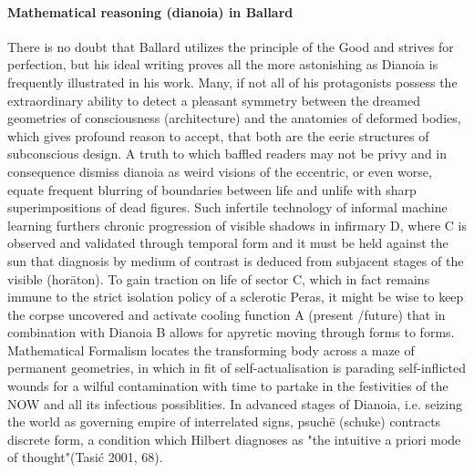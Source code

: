 \documentclass{article}
\begin{document}
\paragraph{Mathematical reasoning (dianoia) in Ballard}
There is no doubt that Ballard 
utilizes the principle of the Good and strives for perfection, 
but his ideal writing proves all the more astonishing 
as Dianoia is frequently illustrated in his work. 
Many, if not all of his protagonists possess the extraordinary ability to 
detect a pleasant symmetry between the dreamed geometries of 
consciousness (architecture) and the anatomies of deformed bodies, which gives profound reason to accept, 
that both are the eerie structures of subconscious design. 
A truth to which baffled readers may not be privy 
and in consequence dismiss dianoia as weird visions of the eccentric, or even worse, 
equate frequent blurring of boundaries between life and unlife 
with sharp superimpositions of dead figures. 
Such infertile technology of informal machine learning furthers 
chronic progression of visible shadows in infirmary D, 
where C is observed and validated through temporal form and it 
must be held against the sun that diagnosis by medium of contrast is 
deduced from subjacent stages of the visible (hor\={a}ton). 
To gain traction on life of sector C, 
which in fact remains immune to the strict isolation policy of a sclerotic Peras, 
it might be wise to keep the corpse uncovered 
and activate cooling function A (present /future) 
that in combination with Dianoia B 
allows for apyretic moving through forms to forms. 
Mathematical Formalism locates the transforming body 
across a maze of permanent geometries, 
in which in fit of self-actualisation is parading self-inflicted wounds 
for a wilful contamination with time to partake in the festivities 
of the NOW and all its infectious possiblities.
In advanced stages of Dianoia, i.e. 
seizing the world as governing empire of interrelated signs, 
psuch\={e} (schuke) contracts discrete form, a condition which 
Hilbert diagnoses as
"the intuitive a priori mode of thought"(Tasi\'{c} 2001, 68).
\end{document}
